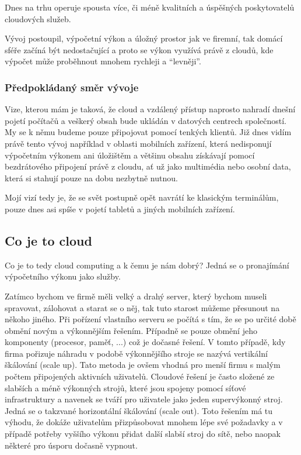 Dnes na trhu operuje spousta více, či méně kvalitních a úspěšných poskytovatelů cloudových služeb.

Vývoj postoupil, výpočetní výkon a úložný prostor jak ve firemní, tak domácí sféře začíná být nedostačující a proto se výkon využívá právě z cloudů, kde výpočet může proběhnout mnohem rychleji a "`levněji"'.

\subsubsection{Předpokládaný směr vývoje}
Vize, kterou mám je taková, že cloud a vzdálený přístup naprosto nahradí dnešní pojetí počítačů a veškerý obsah bude ukládán v datových centrech společností. My se k němu budeme pouze připojovat pomocí tenkých klientů. Již dnes vidím právě tento vývoj například v oblasti mobilních zařízení, která nedisponují výpočetním výkonem ani úložištěm a většinu obsahu získávají pomocí bezdrátového připojení právě z cloudu, ať už jako multimédia nebo osobní data, která si stahují pouze na dobu nezbytně nutnou.

Mojí vizí tedy je, že se svět postupně opět navrátí ke klasickým terminálům, pouze dnes asi spíše v pojetí tabletů a jiných mobilních zařízení.

\subsection{Co je to cloud}
Co je to tedy cloud computing a k čemu je nám dobrý? Jedná se o pronajímání výpočetního výkonu jako služby.

Zatímco bychom ve firmě měli velký a drahý server, který bychom museli spravovat, zálohovat a starat se o něj, tak tuto starost můžeme přesunout na někoho jiného. Při pořízení vlastního serveru se počítá s tím, že se po určité době obmění novým a výkonnějším řešením. Případně se pouze obmění jeho komponenty (procesor, paměť, ...) což je dočasné řešení. V tomto případě, kdy firma pořizuje náhradu v podobě výkonnějšího stroje se nazývá vertikální škálování (scale up). Tato metoda je ovšem vhodná pro menší firmu s malým počtem připojených aktivních uživatelů. Cloudové řešení je často složené ze slabších a méně výkonných strojů, které jsou spojeny pomocí síťové infrastruktury a navenek se tváří pro uživatele jako jeden supervýkonný stroj. Jedná se o takzvané horizontální škálování (scale out). Toto řešením má tu výhodu, že dokáže uživatelům přizpůsobovat mnohem lépe své požadavky a v případě potřeby vyššího výkonu přidat další slabší stroj do sítě, nebo naopak některé pro úsporu dočasně vypnout.\cite{wiki:Skalovatelnost}\nocite{cpress:cloudComputing}

